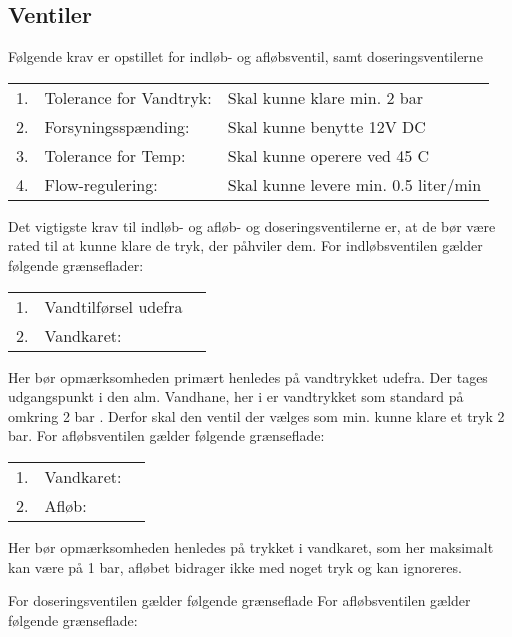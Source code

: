 \subsection{Ventiler}
Følgende krav er opstillet for indløb- og afløbsventil, samt doseringsventilerne 

\begin{table}[h]
	\begin{tabular}{ l l l }
		1. 	& Tolerance for Vandtryk:   	& Skal kunne klare min. 2 bar \\
		2. 	& Forsyningsspænding: 			& Skal kunne benytte 12V DC \\
		3.	& Tolerance for Temp: 			& Skal kunne operere ved 45 C \\
		4.	& Flow-regulering: 				& Skal kunne levere min. 0.5 liter/min
	\end{tabular}
\end{table}

Det vigtigste krav til indløb- og afløb- og doseringsventilerne er, at de bør være rated til at kunne klare de tryk, der påhviler dem. 
For indløbsventilen gælder følgende grænseflader: 

\begin{table}[h]
	\begin{tabular}{ l l l }
		1. 	& Vandtilførsel udefra   		& \\
		2. 	& Vandkaret: 					&
	\end{tabular}
\end{table}

Her bør opmærksomheden primært henledes på vandtrykket udefra. 
Der tages udgangspunkt i den alm. Vandhane, her i er vandtrykket som standard på omkring 2 bar . 
Derfor skal den ventil der vælges som min. kunne klare et tryk 2 bar. 
For afløbsventilen gælder følgende grænseflade: 

\begin{table}[h]
	\begin{tabular}{ l l l }
		1. 	& Vandkaret:  					& \\
		2. 	& Afløb: 						&
	\end{tabular}
\end{table}

Her bør opmærksomheden henledes på trykket i vandkaret, som her maksimalt kan være på 1 bar, afløbet bidrager ikke med noget tryk og kan ignoreres. 

For doseringsventilen gælder følgende grænseflade
For afløbsventilen gælder følgende grænseflade: 

